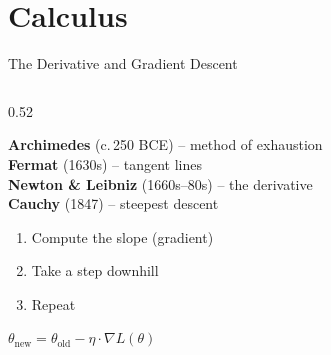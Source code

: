 \documentclass[aspectratio=169,12pt]{beamer}
\begin{document}
\section{Calculus}
\begin{frame}{The Derivative and Gradient Descent}

  \begin{columns}[T]
    \begin{column}{0.52\textwidth}
      \begin{tcolorbox}[colback=calculusRed!5, colframe=calculusRed,
        fonttitle=\bfseries\small, title={The Calculus Chain},
        rounded corners, boxrule=0.8pt, left=3pt, right=3pt, top=2pt, bottom=2pt]
        \scriptsize
        \textbf{Archimedes} (c.\,250 BCE) -- method of exhaustion\\[2pt]
        \textbf{Fermat} (1630s) -- tangent lines\\[2pt]
        \textbf{Newton \& Leibniz} (1660s--80s) -- the derivative\\[2pt]
        \textbf{Cauchy} (1847) -- \alert{steepest descent}
      \end{tcolorbox}

      \vspace{0.3em}
      \begin{tcolorbox}[colback=accentOrange!8, colframe=accentOrange,
        fonttitle=\bfseries\small, title={Gradient Descent Recipe},
        rounded corners, boxrule=0.8pt, left=3pt, right=3pt, top=2pt, bottom=2pt]
        \small
        \begin{enumerate}\setlength\itemsep{2pt}
          \item Compute the slope (gradient)
          \item Take a step downhill
          \item Repeat
        \end{enumerate}
        \vspace{2pt}
        \scriptsize $\theta_{\text{new}} = \theta_{\text{old}} - \eta \cdot \nabla L(\theta)$
      \end{tcolorbox}
    \end{column}


\end{columns}
\end{frame}
\end{document}
